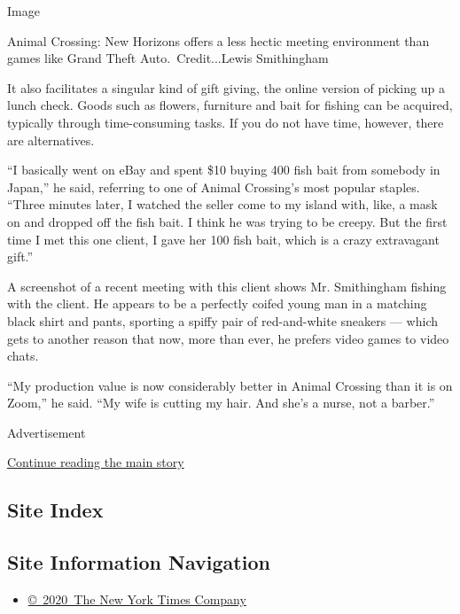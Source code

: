 Image

Animal Crossing: New Horizons offers a less hectic meeting environment
than games like Grand Theft Auto.~Credit...Lewis Smithingham

It also facilitates a singular kind of gift giving, the online version
of picking up a lunch check. Goods such as flowers, furniture and bait
for fishing can be acquired, typically through time-consuming tasks. If
you do not have time, however, there are alternatives.

``I basically went on eBay and spent \$10 buying 400 fish bait from
somebody in Japan,'' he said, referring to one of Animal Crossing's most
popular staples. ``Three minutes later, I watched the seller come to my
island with, like, a mask on and dropped off the fish bait. I think he
was trying to be creepy. But the first time I met this one client, I
gave her 100 fish bait, which is a crazy extravagant gift.''

A screenshot of a recent meeting with this client shows Mr. Smithingham
fishing with the client. He appears to be a perfectly coifed young man
in a matching black shirt and pants, sporting a spiffy pair of
red-and-white sneakers --- which gets to another reason that now, more
than ever, he prefers video games to video chats.

``My production value is now considerably better in Animal Crossing than
it is on Zoom,'' he said. ``My wife is cutting my hair. And she's a
nurse, not a barber.''

Advertisement

\protect\hyperlink{after-bottom}{Continue reading the main story}

\hypertarget{site-index}{%
\subsection{Site Index}\label{site-index}}

\hypertarget{site-information-navigation}{%
\subsection{Site Information
Navigation}\label{site-information-navigation}}

\begin{itemize}
\tightlist
\item
  \href{https://help.nytimes.com/hc/en-us/articles/115014792127-Copyright-notice}{©~2020~The
  New York Times Company}
\end{itemize}

